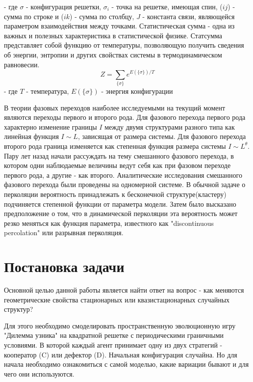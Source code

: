 \documentclass[a4paper]{article}
\begin{document}
	- где $\sigma$ - конфигурация решетки, $\sigma_{i}$ - точка на решетке, имеющая спин, ($ij$) - сумма по строке и ($ik$) - сумма по столбцу, $J$ - константа связи, являющейся параметром взаимодействия между точками. Статистическая сумма - одна из важных и полезных характеристика в статистической физике. Статсумма представляет собой функцию от температуры, позволяющую получить сведения об энергии, энтропии и других свойствах системы в термодинамическом равновесии. 
	\begin{equation}\label{statsum}
		Z = \sum_{\{\sigma\}}e^{E(\{\sigma\})/T}
	\end{equation}
	- где $T$ - температура, $E(\{\sigma\})$ - энергия конфигурации
	
	\par В теории фазовых переходов\cite{phase_trans} наиболее исследуемыми на текущий момент являются переходы первого и второго рода. Для фазового перехода первого рода характерно изменение границы $I$ между двумя структурами разного типа как линейная функция $I \sim L$\cite{first_order}, зависящая от размера системы. Для фазового перехода второго рода граница изменяется как степенная функция размера системы $I \sim L^{\theta}$\cite{finite_size}. Пару лет назад начали рассуждать на тему смешанного фазового перехода, в котором одни наблюдаемые величины ведут себя как при фазовом переходе первого рода, а другие - как второго. Аналитические исследования смешанного фазового перехода были проведены на одномерной системе\cite{mixed_order}. В обычной задаче о перколяции вероятность принадлежать к бесконечной структуре(кластеру)	подчиняется степенной функции от параметра модели. Затем было высказано предположение о том, что в динамической перколяции эта вероятность может резко меняться как функция параметра\cite{boostrap}, известного как "discontinuous percolation"\cite{discont_perc} или разрывная перколяция. 
	
	\section{Постановка задачи}
	
	\par Основной целью данной работы является найти ответ на вопрос - как меняются геометрические свойства стационарных или квазистационарных случайных структур?
	
	\par Для этого необходимо смоделировать пространственную эволюционную игру "Дилемма узника" на квадратной решетке с периодическими граничными условиями. В которой каждый агент принимает одну из двух стратегий - кооператор (C) или дефектор (D). Начальная конфигурация случайна. Но для начала необходимо ознакомиться с самой моделью, какие вариации бывают и для чего они используются.
	
\end{document}
